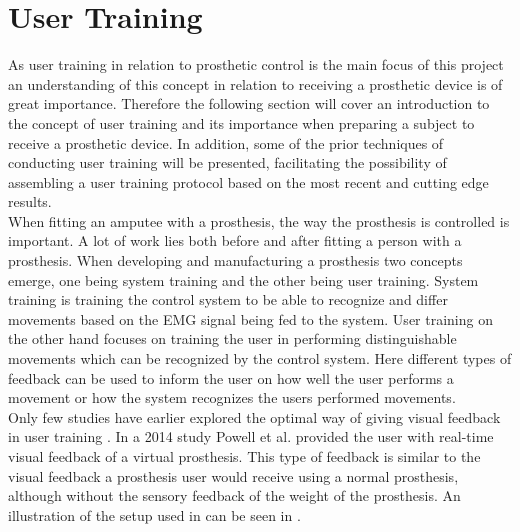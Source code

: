 
\section{User Training} \label{sec:BG:userTraining}

As user training in relation to prosthetic control is the main focus of this project an understanding of this concept in relation to receiving a prosthetic device is of great importance. Therefore the following section will cover an introduction to the concept of user training and its importance when preparing a subject to receive a prosthetic device. In addition, some of the prior techniques of conducting user training will be presented, facilitating the possibility of assembling a user training protocol based on the most recent and cutting edge results. \\
When fitting an amputee with a prosthesis, the way the prosthesis is controlled is important. A lot of work lies both before and after fitting a person with a prosthesis. When developing and manufacturing a prosthesis two concepts emerge, one being system training and the other being user training. System training is training the control system to be able to recognize and differ movements based on the EMG signal being fed to the system. \cite{Fougner2012} User training on the other hand focuses on training the user in performing distinguishable movements which can be recognized by the control system. Here different types of feedback can be used to inform the user on how well the user performs a movement or how the system recognizes the users performed movements. \cite{Powell2014,Simon2013} \\
Only few studies have earlier explored the optimal way of giving visual feedback in user training \cite{Jiang2012}. In a 2014 study Powell et al. \cite{Powell2014} provided the user with real-time visual feedback of a virtual prosthesis. This type of feedback is similar to the visual feedback a prosthesis user would receive using a normal prosthesis, although without the sensory feedback of the weight of the prosthesis. An illustration of the setup used in \cite{Powell2014} can be seen in .

